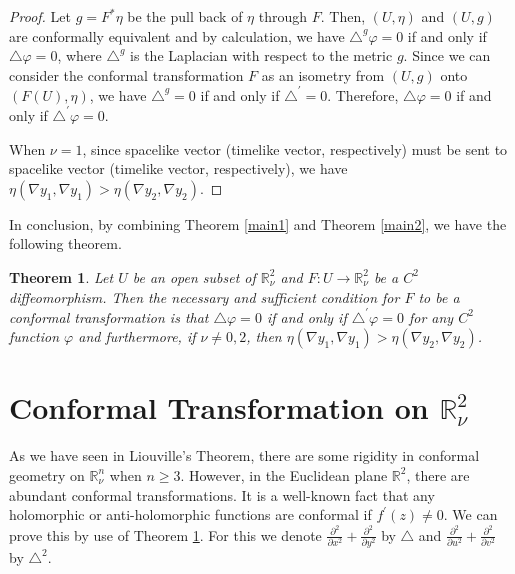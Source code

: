 \documentclass[a4paper,10pt]{amsart}
\theoremstyle{plain}
\newtheorem{thm}{Theorem}[section]
\newtheorem*{main theorem}{Theorem}
\theoremstyle{definition}
\begin{document}
\begin{proof}
Let $g = F^\ast \eta$ be the pull back of $\eta$ through $F$.
Then, $(U, \eta)$ and $(U,g)$ are conformally equivalent and by
calculation, we have  $\triangle^g \varphi = 0$ if and only if
$\triangle \varphi = 0$, where $\triangle^g$ is the Laplacian with
respect to the metric $g$. Since we can consider the conformal
transformation $F$ as an isometry from $(U,g)$ onto $(F(U),
\eta)$, we have $\triangle^g = 0$ if and only if $\triangle^\prime
= 0$. Therefore, $\triangle \varphi = 0$ if and only if
$\triangle^\prime \varphi = 0$.


 When $\nu = 1$, since spacelike
vector (timelike vector, respectively) must be sent to spacelike
vector (timelike vector, respectively), we have $\eta(\nabla y_1,
\nabla y_1) > \eta(\nabla y_2, \nabla y_2)$.
\end{proof}


In conclusion, by combining Theorem \ref{main1} and Theorem
\ref{main2}, we have the following theorem.

\begin{thm} \label{final}
Let $U$ be an open subset of $\mathbb{R}^2_\nu$ and $F : U
\rightarrow \mathbb{R}^2_\nu$ be a $C^2$ diffeomorphism. Then the
necessary and sufficient condition for $F$ to be a conformal
transformation is that $\triangle \varphi = 0$ if and only if
$\triangle^\prime \varphi = 0$ for any $C^2$ function $\varphi$
and furthermore, if $\nu \neq 0, 2$, then $\eta(\nabla y_1, \nabla
y_1)
> \eta(\nabla y_2, \nabla y_2)$.
\end{thm}




























\section{Conformal Transformation on $\mathbb{R}^2_\nu$} \label{section:3}

As we have seen in Liouville's Theorem, there are some rigidity in
conformal geometry on $\mathbb{R}^n_\nu$ when $n \geq 3$. However,
in the Euclidean plane $\mathbb{R}^2$, there are abundant
conformal transformations. It is a well-known fact that any
holomorphic or anti-holomorphic functions are conformal if
$f^\prime(z) \neq 0$. We can prove this by use of Theorem
\ref{final}. For this we denote $\frac{\partial^2}{\partial x^2} +
\frac{\partial^2}{\partial y^2}$ by $\triangle$ and
$\frac{\partial^2}{\partial u^2} + \frac{\partial^2}{\partial
v^2}$ by $\triangle^2$.
\end{document}
